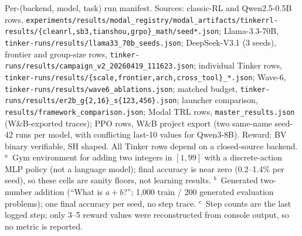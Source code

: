 \begin{table}[htbp]
\caption{Per-(backend, model, task) run manifest. Sources:
classic-RL and Qwen2.5-0.5B rows,
\texttt{experiments/\allowbreak{}results/\allowbreak{}modal\_registry/\allowbreak{}modal\_artifacts/\allowbreak{}tinkerrl-results/\allowbreak{}\{cleanrl,sb3,tianshou,grpo\}\_math/\allowbreak{}seed*.json};
Llama-3.3-70B, \texttt{tinker-runs/\allowbreak{}results/\allowbreak{}llama33\_70b\_seeds.json};
DeepSeek-V3.1 (3 seeds), frontier and group-size rows,
\texttt{tinker-runs/\allowbreak{}results/\allowbreak{}campaign\_v2\_20260419\_111623.json};
individual Tinker rows, \texttt{tinker-runs/\allowbreak{}results/\allowbreak{}\{scale,frontier,arch,cross\_tool\}\_*.json};
Wave-6, \texttt{tinker-runs/\allowbreak{}results/\allowbreak{}wave6\_ablations.json};
matched budget, \texttt{tinker-runs/\allowbreak{}results/\allowbreak{}er2b\_g\{2,16\}\_s\{123,456\}.json};
launcher comparison, \texttt{results/\allowbreak{}framework\_comparison.json};
Modal TRL rows, \texttt{master\_results.json} (W\&B-exported traces);
PPO rows, W\&B project export (two same-name seed-42 runs per model, with
conflicting last-10 values for Qwen3-8B). Reward: BV binary verifiable, SH
shaped. All Tinker rows depend on a closed-source backend.
$^a$~Gym environment for adding two integers in $[1,99]$ with a discrete-action
MLP policy (not a language model); final accuracy is near zero (0.2--1.4\% per seed),
so these cells are sanity floors, not learning results.
$^b$~Generated two-number addition (``What is $a{+}b$?''; 1{,}000 train / 200
generated evaluation problems); one final accuracy per seed, no step trace.
$^c$~Step counts are the last logged step; only 3--5 reward values were
reconstructed from console output, so no metric is reported.}
\label{tab:run-manifest}
\end{table}
